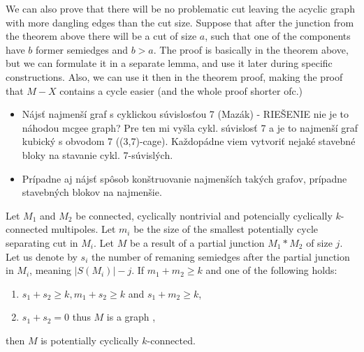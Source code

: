 \documentclass[12pt, twoside]{book}
\begin{document}
\todo{}We can also prove that there will be no problematic cut leaving the acyclic graph with more dangling edges than the cut size. Suppose that after the junction from the theorem above there will be a cut of size $a$, such that one of the components have $b$ former semiedges and $b>a$. The proof is basically in the theorem above, but we can formulate it in a separate lemma, and use it later during specific constructions. Also, we can use it then in the theorem proof, making the proof that $M-X$ contains a cycle easier (and the whole proof shorter ofc.)

\begin{itemize}
	\item Nájsť najmenší graf s cyklickou súvislosťou 7 (Mazák) - RIEŠENIE nie je to náhodou mcgee graph? Pre ten mi vyšla cykl. súvislosť 7 a je to najmenší graf kubický s obvodom 7 ((3,7)-cage). Každopádne viem vytvoriť nejaké stavebné bloky na stavanie cykl. 7-súvislých.
	\item Prípadne aj nájsť spôsob konštruovanie najmenších takých grafov, prípadne stavebných blokov na najmenšie.
\end{itemize}

\begin{theorem}\label{th:connecting-potencially-cyclically-connected-with-number-of-resulting-semiedges}
	Let $M_1$ and $M_2$ be connected, cyclically nontrivial and potencially cyclically $k$-connected multipoles. Let $m_i$ be the size of the smallest potentially cycle separating cut in $M_i$. Let $M$ be a result of a partial junction $M_1*M_2$ of size $j$. Let us denote by $s_i$ the number of remaning semiedges after the partial junction in $M_i$, meaning $|S(M_i)|-j$. If $m_1+m_2\geq k$ and one of the following holds:
	
	\begin{enumerate}
		\item $s_1+s_2\geq k, m_1+s_2\geq k$ and $s_1+m_2\geq k$,
		\item $s_1+s_2=0$ thus $M$ is a graph ,
	\end{enumerate}

	then $M$ is potentially cyclically $k$-connected.
\end{theorem}
\end{document}
